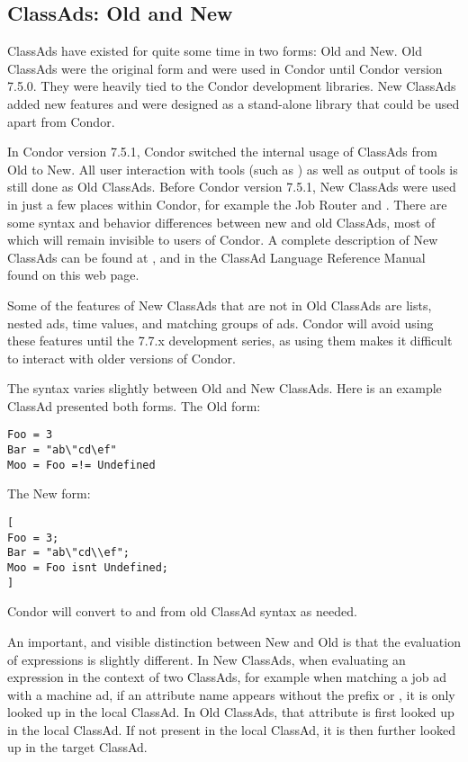 \subsection{\label{classad-newandold}
ClassAds: Old and New}
\label{sec:classad-differences}

ClassAds have existed for quite some time in two forms:
Old and New.
Old ClassAds were the original form and were used in Condor
until Condor version 7.5.0.
They were heavily tied to the Condor development libraries.
New ClassAds added new features
and were designed as a stand-alone library that could be used apart
from Condor.

In Condor version 7.5.1, Condor switched the internal usage of
ClassAds from Old to New.
All user interaction with tools (such as ) as well as
output of tools is still done as Old ClassAds.
Before Condor version 7.5.1, New ClassAds were used in just a few places 
within Condor, for example
the Job Router and   .
There are some syntax and behavior differences between new and old
ClassAds,
most of which will remain invisible to users of Condor.
A complete description of New ClassAds can be found at
,
and in the ClassAd Language Reference Manual found on this web page.

Some of the features of New ClassAds that are not in Old ClassAds are
lists, nested ads, time values, and matching groups of ads.
Condor will
avoid using these features until the 7.7.x development series, as using
them makes it difficult to interact with older versions of Condor.

The syntax varies slightly between Old and New ClassAds.
Here is an example ClassAd presented both forms.
The Old form:

\begin{verbatim}
Foo = 3
Bar = "ab\"cd\ef"
Moo = Foo =!= Undefined
\end{verbatim}

The New form:

\begin{verbatim}
[
Foo = 3;
Bar = "ab\"cd\\ef";
Moo = Foo isnt Undefined;
]
\end{verbatim}

Condor will convert to and from old ClassAd syntax as needed.

An important, and visible distinction between New and Old is
that the evaluation of expressions is slightly different.
In New ClassAds,
when evaluating an expression in the context of two ClassAds,
for example when matching a job ad with a machine ad,
if an attribute name appears without the prefix  or ,
it is only looked up in the local ClassAd.
In Old ClassAds,
that attribute is first looked up in the local ClassAd.
If not present in the local ClassAd, 
it is then further looked up in the target ClassAd.

